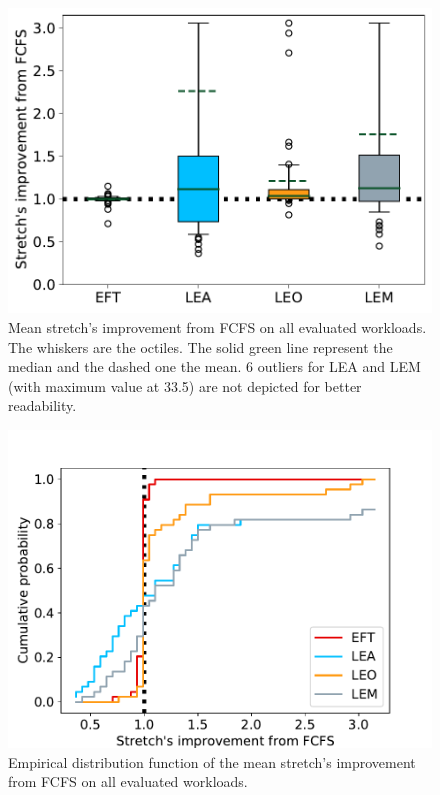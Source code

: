 \documentclass[conference,10pt]{IEEEtran}
\begin{document}
\begin{figure}[t]\centering\includegraphics[width=0.9\linewidth]{../MBSS/plot/Boxplot/box_plot_mean_stretch_all_workloads.pdf}\caption{Mean stretch's improvement from FCFS on all evaluated workloads. The whiskers are the octiles. The solid green line represent the median and the dashed one the mean. 6 outliers for LEA and LEM (with maximum value at 33.5) are not depicted for better readability.}\label{boxplot.all}\end{figure}
\begin{figure}[t]\centering\includegraphics[width=0.9\linewidth]{../MBSS/plot/ECDF/ecdf_mean_stretch_all_workloads.pdf}\caption{Empirical distribution function of the mean stretch's improvement from FCFS on all evaluated workloads.}\label{ecdf}\end{figure}
\end{document}
